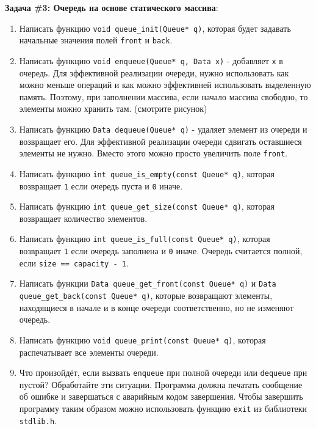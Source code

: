 \documentclass{article}
\begin{document}
\textbf{Задача \#3: Очередь на основе статического массива}:
\begin{enumerate}
\item Написать функцию \texttt{void queue\_init(Queue* q)}, которая будет задавать начальные значения полей \texttt{front} и \texttt{back}.
\item Написать функцию \texttt{void enqueue(Queue* q, Data x)} - добавляет \texttt{x} в очередь. Для эффективной реализации очереди, нужно использовать как можно меньше операций и как можно эффективней использовать выделенную память. Поэтому, при заполнении массива, если начало массива свободно, то элементы можно хранить там. (смотрите рисунок)
\item Написать функцию \texttt{Data dequeue(Queue* q)} - удаляет элемент из очереди и возвращает его. Для  эффективной реализации очереди сдвигать оставшиеся элементы не нужно. Вместо этого можно просто увеличить поле \texttt{front}.
\item Написать функцию \texttt{int queue\_is\_empty(const Queue* q)}, которая возвращает \texttt{1} если очередь пуста и \texttt{0} иначе.
\item Написать функцию \texttt{int queue\_get\_size(const Queue* q)}, которая возвращает количество элементов.
\item Написать функцию \texttt{int queue\_is\_full(const Queue* q)}, которая возвращает \texttt{1} если очередь заполнена и \texttt{0} иначе. Очередь считается полной, если \texttt{size == capacity - 1}.
\item Написать функции \texttt{Data queue\_get\_front(const Queue* q)} и \texttt{Data queue\_get\_back(const Queue* q)}, которые возвращают элементы, находящиеся в начале и в конце очереди соответственно, но не изменяют очередь.
\item Написать функцию \texttt{void queue\_print(const Queue* q)}, которая распечатывает все элементы очереди.
\item Что произойдёт, если вызвать \texttt{enqueue} при полной очереди или \texttt{dequeue} при пустой? Обработайте эти ситуации. Программа должна печатать сообщение об ошибке и завершаться с аварийным кодом завершения. Чтобы завершить программу таким образом можно использовать функцию \texttt{exit} из библиотеки \texttt{stdlib.h}.


\end{enumerate}
\end{document}
